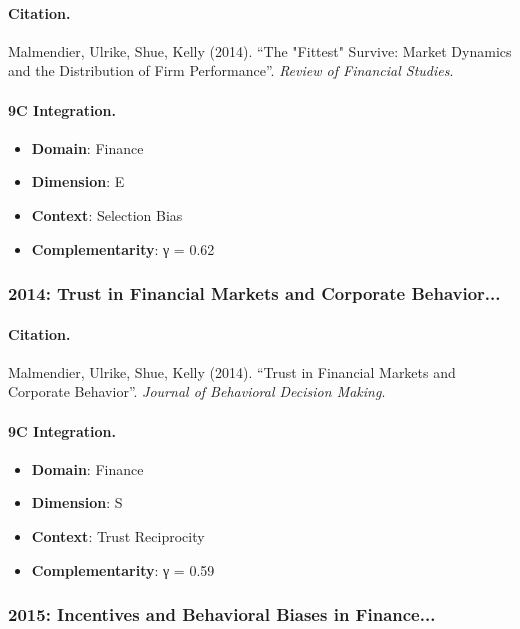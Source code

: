 \paragraph{Citation.}
Malmendier, Ulrike, Shue, Kelly (2014). ``The "Fittest" Survive: Market Dynamics and the Distribution of Firm Performance''. \textit{Review of Financial Studies}.

\paragraph{9C Integration.}
\begin{itemize}[nosep]
  \item \textbf{Domain}: Finance
  \item \textbf{Dimension}: E
  \item \textbf{Context}: Selection Bias
  \item \textbf{Complementarity}: γ = 0.62
\end{itemize}


\subsubsection{2014: Trust in Financial Markets and Corporate Behavior...}

\paragraph{Citation.}
Malmendier, Ulrike, Shue, Kelly (2014). ``Trust in Financial Markets and Corporate Behavior''. \textit{Journal of Behavioral Decision Making}.

\paragraph{9C Integration.}
\begin{itemize}[nosep]
  \item \textbf{Domain}: Finance
  \item \textbf{Dimension}: S
  \item \textbf{Context}: Trust Reciprocity
  \item \textbf{Complementarity}: γ = 0.59
\end{itemize}


\subsubsection{2015: Incentives and Behavioral Biases in Finance...}

